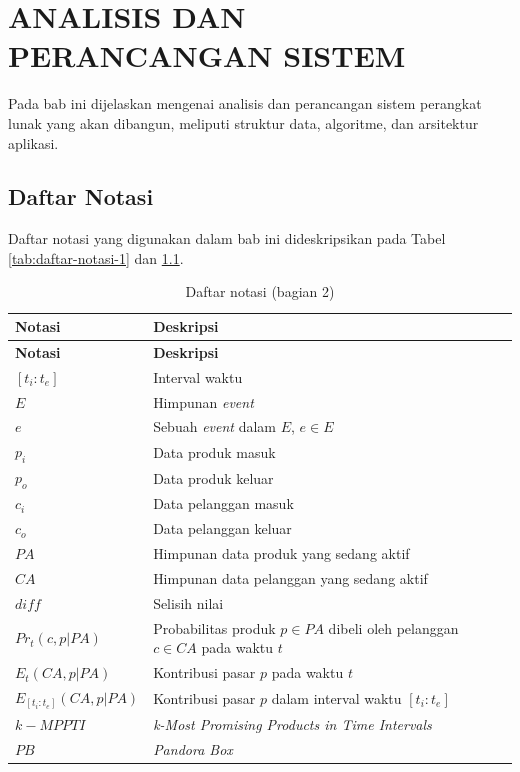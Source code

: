 \chapter{ANALISIS DAN PERANCANGAN SISTEM} \label{chap:analisis-perancangan-sistem}
\tab Pada bab ini dijelaskan mengenai analisis dan perancangan sistem perangkat lunak yang akan dibangun, meliputi struktur data, algoritme, dan arsitektur aplikasi. 

\section{Daftar Notasi}
\tab Daftar notasi yang digunakan dalam bab ini dideskripsikan pada Tabel \ref{tab:daftar-notasi-1} dan \ref{tab:daftar-notasi-2}.

\begin{longtable}{| p{3cm} | p{6cm} |} 
	\caption{Daftar notasi (bagian 2) \label{tab:daftar-notasi-2}}\\
	\hline
	\textbf{Notasi} & \textbf{Deskripsi}\\ \hline
	\endfirsthead
	\hline
	\textbf{Notasi} & \textbf{Deskripsi}\\ \hline
	\endhead
	$[t_i:t_e]$ & Interval waktu \\ \hline
	$E$ & Himpunan \textit{event} \\ \hline
	$e$ & Sebuah \textit{event} dalam $E$, $e \in E$ \\ \hline
	$p_{i}$ & Data produk masuk \\ \hline
	$p_{o}$ & Data produk keluar \\ \hline
	$c_{i}$ & Data pelanggan masuk \\ \hline
	$c_{o}$ & Data pelanggan keluar \\ \hline
	$PA$ & Himpunan data produk yang sedang aktif \\ \hline	
	$CA$ & Himpunan data pelanggan yang sedang aktif \\ \hline
	$diff$ & Selisih nilai \\ \hline
	$Pr_t(c, p|PA)$ & Probabilitas produk $p \in PA$ dibeli oleh pelanggan $c \in CA$ pada waktu $t$ \\ \hline
	$E_t(CA, p|PA)$ & Kontribusi pasar $p$ pada waktu $t$ \\ \hline
	$E_{[t_i:t_e]}(CA, p|PA)$ & Kontribusi pasar $p$ dalam interval waktu $[t_i:t_e]$\\ \hline
	$k-MPPTI$ & \textit{k-Most Promising Products in Time Intervals} \\ \hline
	$PB$ & \textit{Pandora Box} \\ \hline
\end{longtable}

